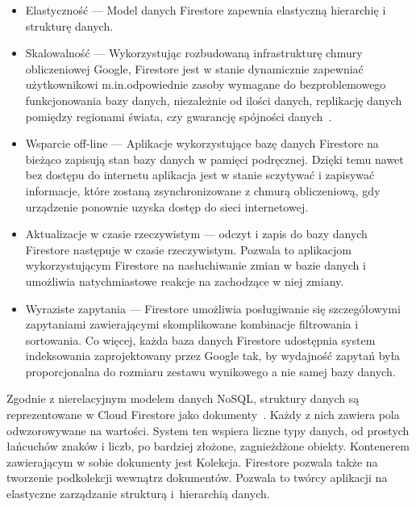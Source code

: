         \begin{itemize}
        \item Elastyczność — Model danych Firestore zapewnia elastyczną hierarchię i strukturę danych. 
        
        \item Skalowalność — Wykorzystując rozbudowaną infrastrukturę chmury obliczeniowej Google, Firestore jest w stanie dynamicznie zapewniać użytkownikowi m.in.\@ odpowiednie zasoby
        wymagane do bezproblemowego funkcjonowania bazy danych, niezależnie od ilości danych, replikację danych pomiędzy regionami świata, czy gwarancję spójności danych~\cite{FIRESTORE_SCALE}. 
        
        \item Wsparcie off-line — Aplikacje wykorzystujące bazę danych Firestore na bieżąco zapisują stan bazy danych w pamięci podręcznej. Dzięki temu nawet bez dostępu do internetu aplikacja 
        jest w stanie sczytywać i zapisywać informacje, które zostaną zsynchronizowane z chmurą obliczeniową, gdy urządzenie ponownie uzyska dostęp do sieci internetowej. 
        
        \item Aktualizacje w czasie rzeczywistym — odczyt i zapis do bazy danych Firestore następuje w czasie rzeczywistym. Pozwala to aplikacjom wykorzystującym Firestore na nasłuchiwanie zmian 
        w bazie danych i umożliwia natychmiastowe reakcje na zachodzące w niej zmiany. 

        \item Wyraziste zapytania — Firestore umożliwia posługiwanie się szczegółowymi zapytaniami zawierającymi skomplikowane kombinacje filtrowania i sortowania. Co więcej, każda baza danych Firestore udostępnia
        system indeksowania zaprojektowany przez Google tak, by wydajność zapytań była proporcjonalna do rozmiaru zestawu wynikowego a nie samej bazy danych. 
 
    \end{itemize}

        Zgodnie z nierelacyjnym modelem danych NoSQL, struktury danych są reprezentowane w Cloud Firestore jako dokumenty~\cite{FIRESTORE_DOCS}. Każdy z nich zawiera pola odwzorowywane na wartości.
        System ten wspiera liczne typy danych, od prostych łańcuchów znaków i liczb, po bardziej złożone, zagnieżdżone obiekty. Kontenerem zawierającym w sobie dokumenty jest Kolekcja.
        Firestore pozwala także na tworzenie podkolekcji wewnątrz dokumentów. Pozwala to twórcy aplikacji na elastyczne zarządzanie strukturą i~hierarchią danych. 

